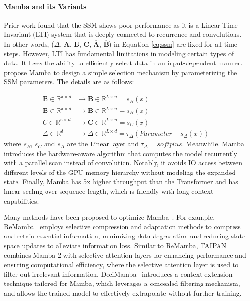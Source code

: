 \documentclass[11pt, a4paper, logo, copyright, nonumbering]{map}
\begin{document}
\paragraph{Mamba and its Variants}
Prior work found that the SSM shows poor performance as it is a Linear Time-Invariant (LTI) system that is deeply connected to recurrence and convolutions. In other words, ($\Delta$, $\mathbf{A}$, $\mathbf{B}$, $\mathbf{C}$, $\overline{\mathbf{A}}$, $\overline{\mathbf{B}}$) in Equation \ref{eq:ssm} are fixed for all time-steps. However, LTI has fundamental limitations in modeling certain types of data. It loses the ability to efficiently select data in an input-dependent manner. ~\citet{gu2024mamba} propose Mamba to design a simple selection mechanism by parameterizing the SSM parameters. The details are as follows:

\begin{equation}
\begin{aligned}
\mathbf{B} \in \mathbb{R}^{n \times d} & \rightarrow \mathbf{B} \in \mathbb{R}^{L \times n} = s_{B}(x) \\
\mathbf{B} \in \mathbb{R}^{n \times d} & \rightarrow \mathbf{B} \in \mathbb{R}^{L \times n} = s_{B}(x) \\{C} \in \mathbb{R}^{n \times d} & \rightarrow \mathbf{C} \in \mathbb{R}^{L \times n} = s_{C}(x) \\
\Delta \in \mathbb{R}^{d} & \rightarrow \Delta \in \mathbb{R}^{L \times d} = \tau_{\Delta}(Parameter + s_{\Delta}(x))
\label{eq:Mamba}
\end{aligned}
\end{equation}
where $s_{B}$, $s_{C}$ and $s_{\Delta}$ are the Linear layer and $\tau_{\Delta}=softplus$.
Meanwhile, Mamba introduces the hardware-aware algorithm that computes the model recurrently with a parallel scan instead of convolution. Notably, it avoids IO access between different levels of the GPU memory hierarchy without modeling the expanded state. Finally, Mamba has 5x higher throughput than the  Transformer and has linear scaling over sequence length, which is friendly with long context capabilities.


Many methods have been proposed to optimize Mamba~\cite{chen2024stuffedmambastatecollapse, yuan2025remambaequipmambaeffective}. 
For example,
ReMamba~\cite{yuan2025remambaequipmambaeffective} employs selective compression and adaptation methods to compress and retain essential information, minimizing data degradation and reducing state space updates to alleviate information loss.
Similar to ReMamba, TAIPAN ~\citep{vannguyen2024taipanefficientexpressivestate} combines Mamba-2 with selective attention layers for enhancing performance and ensuring computational efficiency,
where the selective attention layer is used to filter out irrelevant information.  DeciMamba~\citep{benkish2024decimambaexploringlengthextrapolation} introduces a context-extension technique tailored for Mamba,
which leverages a concealed filtering mechanism, and allows the trained model to effectively extrapolate without further training.
\end{document}
